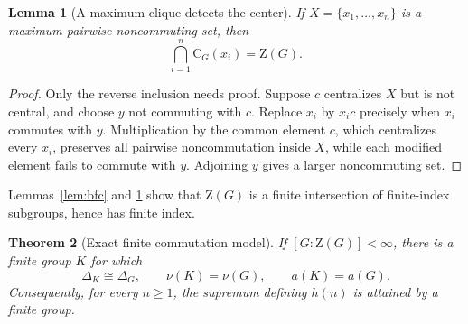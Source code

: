 \documentclass[11pt]{article}
\newtheorem{theorem}{Theorem}[section]
\newtheorem{lemma}[theorem]{Lemma}
\theoremstyle{remark}
\newcommand{\nuG}{\nu}
\newcommand{\aG}{a}
\newcommand{\Z}{\mathrm Z}
\newcommand{\CG}{\mathrm C}
\begin{document}
\begin{lemma}[A maximum clique detects the center]\label{lem:center}
If $X=\{x_1,\dots,x_n\}$ is a maximum pairwise noncommuting set, then
\[
 \bigcap_{i=1}^n\CG_G(x_i)=\Z(G).
\]
\end{lemma}

\begin{proof}
Only the reverse inclusion needs proof.  Suppose $c$ centralizes $X$ but is
not central, and choose $y$ not commuting with $c$.  Replace $x_i$ by
$x_ic$ precisely when $x_i$ commutes with $y$.  Multiplication by the common
element $c$, which centralizes every $x_i$, preserves all pairwise
noncommutation inside $X$, while each modified element fails to commute with
$y$.  Adjoining $y$ gives a larger noncommuting set.
\end{proof}

Lemmas~\ref{lem:bfc} and \ref{lem:center} show that $\Z(G)$ is a finite
intersection of finite-index subgroups, hence has finite index.

\begin{theorem}[Exact finite commutation model]\label{thm:finite-model}
If $[G:\Z(G)]<\infty$, there is a finite group $K$ for which
\[
 \Delta_K\cong\Delta_G,\qquad \nuG(K)=\nuG(G),\qquad \aG(K)=\aG(G).
\]
Consequently, for every $n\ge1$, the supremum defining $h(n)$ is attained
by a finite group.
\end{theorem}
\end{document}
